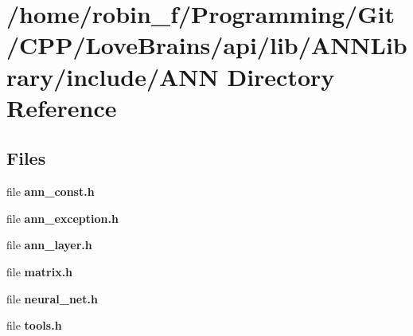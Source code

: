 \section{/home/robin\+\_\+f/\+Programming/\+Git/\+C\+P\+P/\+Love\+Brains/api/lib/\+A\+N\+N\+Library/include/\+A\+N\+N Directory Reference}
\label{dir_403bb258178665442da8be43019acd49}
\subsection*{Files}
\begin{DoxyCompactItemize}
\item 
file {\bfseries ann\+\_\+const.\+h}
\item 
file {\bfseries ann\+\_\+exception.\+h}
\item 
file {\bfseries ann\+\_\+layer.\+h}
\item 
file {\bfseries matrix.\+h}
\item 
file {\bfseries neural\+\_\+net.\+h}
\item 
file {\bfseries tools.\+h}
\end{DoxyCompactItemize}
